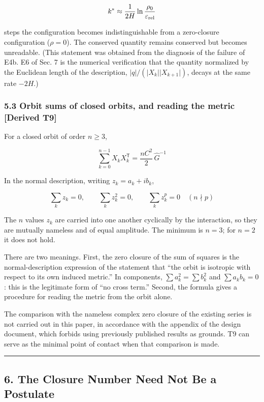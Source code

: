 \documentclass[
  a4paper,
]{article}
\begin{document}
\[
k^{*}\approx\frac{1}{2H}\ln\frac{\rho_0}{\varepsilon_{\rm rel}}
\]

steps the configuration becomes indistinguishable from a zero-closure
configuration (\(\rho=0\)). The conserved quantity remains conserved but
becomes unreadable. (This statement was obtained from the diagnosis of
the failure of E4b. E6 of Sec. 7 is the numerical verification that the
quantity normalized by the Euclidean length of the description,
\(\lvert q\rvert/(\lvert X_k\rvert\lvert X_{k+1}\rvert)\), decays at the
same rate \(-2H\).)

\subsubsection{5.3 Orbit sums of closed orbits, and reading the metric
{[}Derived
T9{]}}\label{orbit-sums-of-closed-orbits-and-reading-the-metric-derived-t9}

For a closed orbit of order \(n\ge3\),

\[
\boxed{\;\sum_{k=0}^{n-1}X_kX_k^{\mathsf T}=\frac{nC^2}{2}\,\hat G^{-1}\;}
\]

In the normal description, writing \(z_k=a_k+ib_k\),

\[
\sum_kz_k=0,\qquad\boxed{\sum_kz_k^2=0},\qquad\sum_kz_k^{p}=0\quad(n\nmid p)
\]

The \(n\) values \(z_k\) are carried into one another cyclically by the
interaction, so they are mutually nameless and of equal amplitude. The
minimum is \(n=3\); for \(n=2\) it does not hold.

There are two meanings. First, the zero closure of the sum of squares is
the normal-description expression of the statement that ``the orbit is
isotropic with respect to its own induced metric.'' In components,
\(\sum a_k^2=\sum b_k^2\) and \(\sum a_kb_k=0\): this is the legitimate
form of ``no cross term.'' Second, the formula gives a procedure for
reading the metric from the orbit alone.

The comparison with the nameless complex zero closure of the existing
series is not carried out in this paper, in accordance with the appendix
of the design document, which forbids using previously published results
as grounds. T9 can serve as the minimal point of contact when that
comparison is made.

\begin{center}\rule{0.5\linewidth}{0.5pt}\end{center}

\subsection{6. The Closure Number Need Not Be a
Postulate}\label{the-closure-number-need-not-be-a-postulate}
\end{document}

